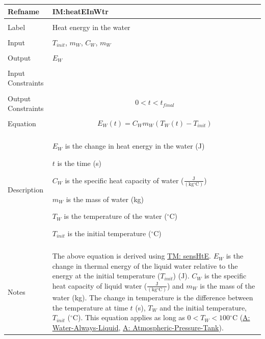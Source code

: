 \documentclass[12pt]{article}
\begin{document}
\noindent \begin{minipage}{\textwidth}
\begin{tabular}{>{\raggedright}p{}>{\raggedright\arraybackslash}p{}}
\toprule \textbf{Refname} & \textbf{IM:heatEInWtr}
\label{IM:heatEInWtr}
\\ \midrule \\
Label & Heat energy in the water
\\ \midrule \\
Input & ${T_{init}}$, ${m_{W}}$, ${C_{W}}$, ${m_{W}}$
\\ \midrule \\
Output & ${E_{W}}$
\\ \midrule \\
Input Constraints & 
\\ \midrule \\
Output Constraints & \begin{displaymath}
                     0<t<{t_{final}}
                     \end{displaymath}
\\ \midrule \\
Equation & \begin{displaymath}
           {E_{W}}\left(t\right)={C_{W}} {m_{W}} \left({T_{W}}\left(t\right)-{T_{init}}\right)
           \end{displaymath}
\\ \midrule \\
Description & \begin{symbDescription}
              \item{${E_{W}}$ is the change in heat energy in the water (J)}
              \item{$t$ is the time (s)}
              \item{${C_{W}}$ is the specific heat capacity of water ($\frac{\text{J}}{(\text{kg}{}^{\circ}\text{C})}$)}
              \item{${m_{W}}$ is the mass of water (kg)}
              \item{${T_{W}}$ is the temperature of the water (${}^{\circ}$C)}
              \item{${T_{init}}$ is the initial temperature (${}^{\circ}$C)}
              \end{symbDescription}
\\ \midrule \\
Notes & The above equation is derived using \hyperref[TM:sensHtE]{TM: sensHtE}. ${E_{W}}$ is the change in thermal energy of the liquid water relative to the energy at the initial temperature (${T_{init}}$) (J). ${C_{W}}$ is the specific heat capacity of liquid water ($\frac{\text{J}}{(\text{kg}{}^{\circ}\text{C})}$) and ${m_{W}}$ is the mass of the water (kg). The change in temperature is the difference between the temperature at time $t$ (s), ${T_{W}}$ and the initial temperature, ${T_{init}}$ (${}^{\circ}$C). This equation applies as long as $0<{T_{W}}<100$${}^{\circ}$C (\hyperref[assumpWAL]{A: Water-Always-Liquid}, \hyperref[assumpAPT]{A: Atmospheric-Pressure-Tank}).
$$
\end{tabular}
\end{minipage}
\end{document}
